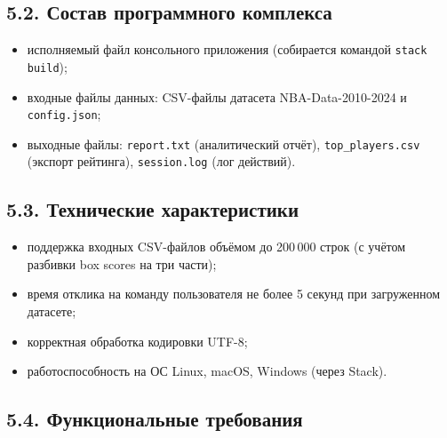 \documentclass[a4paper, final]{article}
\begin{document}
\subsection*{5.2. Состав программного комплекса}

\begin{itemize}
    \item исполняемый файл консольного приложения (собирается командой \texttt{stack build});
    \item входные файлы данных: CSV-файлы датасета NBA-Data-2010-2024 и \texttt{config.json};
    \item выходные файлы: \texttt{report.txt} (аналитический отчёт), \texttt{top\_players.csv} (экспорт рейтинга), \texttt{session.log} (лог действий).
\end{itemize}

\subsection*{5.3. Технические характеристики}

\begin{itemize}
    \item поддержка входных CSV-файлов объёмом до 200\,000 строк (с учётом разбивки box scores на три части);
    \item время отклика на команду пользователя не более 5 секунд при загруженном датасете;
    \item корректная обработка кодировки UTF-8;
    \item работоспособность на ОС Linux, macOS, Windows (через Stack).
\end{itemize}

\subsection*{5.4. Функциональные требования}
\end{document}
